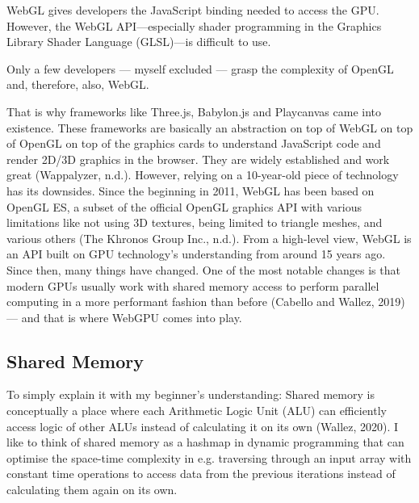 \documentclass[10pt]{article}
\begin{document}
\begin{sloppypar}
  WebGL gives developers the JavaScript binding needed to access the GPU. However, the WebGL API—especially shader programming in the Graphics Library Shader Language (GLSL)—is difficult to use.

  Only a few developers — myself excluded — grasp the complexity of OpenGL and, therefore, also, WebGL.

  That is why frameworks like Three.js, Babylon.js and Playcanvas came into existence. These frameworks are basically an abstraction on top of WebGL on top of OpenGL on top of the graphics cards to understand JavaScript code and render 2D/3D graphics in the browser. They are widely established and work great (Wappalyzer, n.d.). However, relying on a 10-year-old piece of technology has its downsides. Since the beginning in 2011, WebGL has been based on OpenGL ES, a subset of the official OpenGL graphics API with various limitations like not using 3D textures, being limited to triangle meshes, and various others (The Khronos Group Inc., n.d.). From a high-level view, WebGL is an API built on GPU technology’s understanding from around 15 years ago. Since then, many things have changed. One of the most notable changes is that modern GPUs usually work with shared memory access to perform parallel computing in a more performant fashion than before (Cabello and Wallez, 2019) — and that is where WebGPU comes into play.

  \subsection{Shared Memory}
  \label{subsec:shared-memory}

  To simply explain it with my beginner’s understanding: Shared memory is conceptually a place where each Arithmetic Logic Unit (ALU) can efficiently access logic of other ALUs instead of calculating it on its own (Wallez, 2020). I like to think of shared memory as a hashmap in dynamic programming that can optimise the space-time complexity in e.g. traversing through an input array with constant time operations to access data from the previous iterations instead of calculating them again on its own.


\end{sloppypar}
\end{document}
